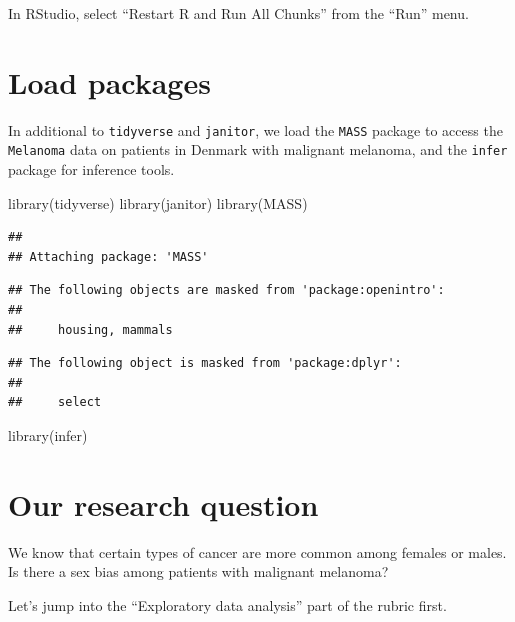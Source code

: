 \documentclass[
]{book}
\newenvironment{Shaded}{\begin{snugshade}}{\end{snugshade}}
\newcommand{\FunctionTok}[1]{\textcolor[rgb]{0.00,0.00,0.00}{#1}}
\newcommand{\NormalTok}[1]{#1}
\begin{document}
In RStudio, select ``Restart R and Run All Chunks'' from the ``Run'' menu.

\hypertarget{hypothesis2-load}{%
\section{Load packages}\label{hypothesis2-load}}

In additional to \texttt{tidyverse} and \texttt{janitor}, we load the \texttt{MASS} package to access the \texttt{Melanoma} data on patients in Denmark with malignant melanoma, and the \texttt{infer} package for inference tools.

\begin{Shaded}
\begin{Highlighting}[]
\FunctionTok{library}\NormalTok{(tidyverse)}
\FunctionTok{library}\NormalTok{(janitor)}
\FunctionTok{library}\NormalTok{(MASS)}
\end{Highlighting}
\end{Shaded}

\begin{verbatim}
## 
## Attaching package: 'MASS'
\end{verbatim}

\begin{verbatim}
## The following objects are masked from 'package:openintro':
## 
##     housing, mammals
\end{verbatim}

\begin{verbatim}
## The following object is masked from 'package:dplyr':
## 
##     select
\end{verbatim}

\begin{Shaded}
\begin{Highlighting}[]
\FunctionTok{library}\NormalTok{(infer)}
\end{Highlighting}
\end{Shaded}

\hypertarget{hypothesis2-question}{%
\section{Our research question}\label{hypothesis2-question}}

We know that certain types of cancer are more common among females or males. Is there a sex bias among patients with malignant melanoma?

Let's jump into the ``Exploratory data analysis'' part of the rubric first.
\end{document}
